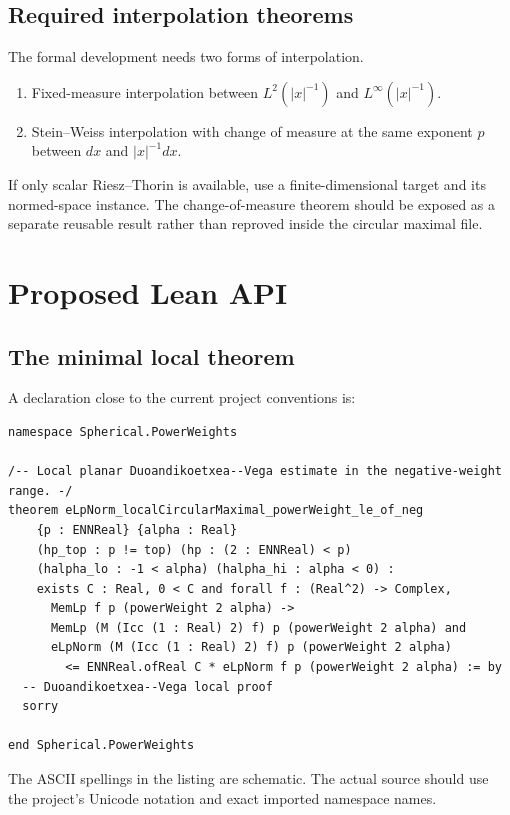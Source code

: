 \documentclass[11pt,a4paper]{article}
\theoremstyle{definition}
\theoremstyle{remark}
\newcommand{\abs}[1]{\left\lvert #1\right\rvert}
\begin{document}
\subsection{Required interpolation theorems}

The formal development needs two forms of interpolation.

\begin{enumerate}[leftmargin=8mm]
\item Fixed-measure interpolation between $L^2(\abs{x}^{-1})$ and
      $L^\infty(\abs{x}^{-1})$.
\item Stein--Weiss interpolation with change of measure at the same exponent
      $p$ between $dx$ and $\abs{x}^{-1}dx$.
\end{enumerate}

If only scalar Riesz--Thorin is available, use a finite-dimensional target and
its normed-space instance.  The change-of-measure theorem should be exposed as
a separate reusable result rather than reproved inside the circular maximal
file.

\section{Proposed Lean API}

\subsection{The minimal local theorem}

A declaration close to the current project conventions is:

\begin{lstlisting}
namespace Spherical.PowerWeights

/-- Local planar Duoandikoetxea--Vega estimate in the negative-weight range. -/
theorem eLpNorm_localCircularMaximal_powerWeight_le_of_neg
    {p : ENNReal} {alpha : Real}
    (hp_top : p != top) (hp : (2 : ENNReal) < p)
    (halpha_lo : -1 < alpha) (halpha_hi : alpha < 0) :
    exists C : Real, 0 < C and forall f : (Real^2) -> Complex,
      MemLp f p (powerWeight 2 alpha) ->
      MemLp (M (Icc (1 : Real) 2) f) p (powerWeight 2 alpha) and
      eLpNorm (M (Icc (1 : Real) 2) f) p (powerWeight 2 alpha)
        <= ENNReal.ofReal C * eLpNorm f p (powerWeight 2 alpha) := by
  -- Duoandikoetxea--Vega local proof
  sorry

end Spherical.PowerWeights
\end{lstlisting}

The ASCII spellings in the listing are schematic.  The actual source should use
the project's Unicode notation and exact imported namespace names.
\end{document}
